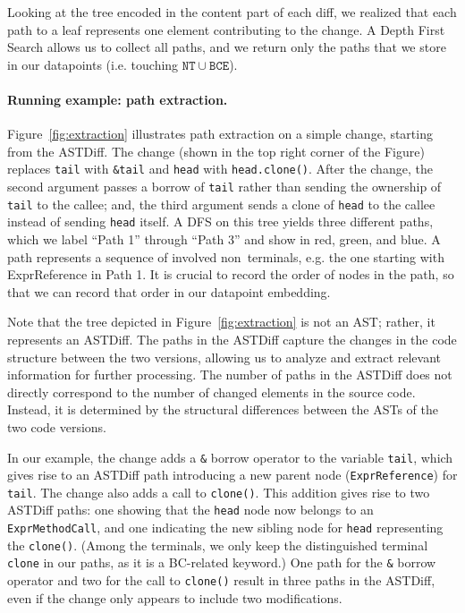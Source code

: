 Looking at the tree encoded in the content part of each diff, we realized that each path to a leaf represents one element contributing to the change. A Depth First Search allows us to collect all paths, and we return only the paths that we store in our datapoints (i.e. touching $\mathtt{NT} \cup \mathtt{BCE}$).

\paragraph{Running example: path extraction.} Figure~\ref{fig:extraction} illustrates path extraction on a simple change, starting from the ASTDiff. The change (shown in the top right corner of the Figure) replaces \verb+tail+ with \verb+&tail+ and \verb+head+ with \verb+head.clone()+. After the change, the second argument passes a borrow of \verb+tail+ rather than sending the ownership of \verb+tail+ to the callee; and, the third argument sends a clone of \verb+head+ to the callee instead of sending \verb+head+ itself. A DFS on this tree yields three different paths, which we label ``Path 1'' through ``Path 3'' and show in red, green, and blue. A path represents a sequence of involved non~terminals, e.g. the one starting with ExprReference in Path 1. It is crucial to record the order of nodes in the path, so that we can record that order in our datapoint embedding.

Note that the tree depicted in Figure~\ref{fig:extraction} is not an AST; rather, it represents an ASTDiff. The paths in the ASTDiff capture the changes in the code structure between the two versions, allowing us to analyze and extract relevant information for further processing. The number of paths in the ASTDiff does not directly correspond to the number of changed elements in the source code. Instead, it is determined by the structural differences between the ASTs of the two code versions.

In our example, the change adds a \verb+&+ borrow operator to the variable \verb+tail+, which gives rise to an ASTDiff path introducing a new parent node (\verb+ExprReference+) for \verb+tail+. The change also adds a call to \verb+clone()+. This addition gives rise to two ASTDiff paths: one showing that the \verb+head+ node now belongs to an \verb+ExprMethodCall+, and one indicating the new sibling node for \verb+head+ representing the \verb+clone()+. (Among the terminals, we only keep the distinguished terminal \verb+clone+ in our paths, as it is a BC-related keyword.) One path for the \verb+&+ borrow operator and two for the call to \verb+clone()+ result in three paths in the ASTDiff, even if the change only appears to include two modifications.

